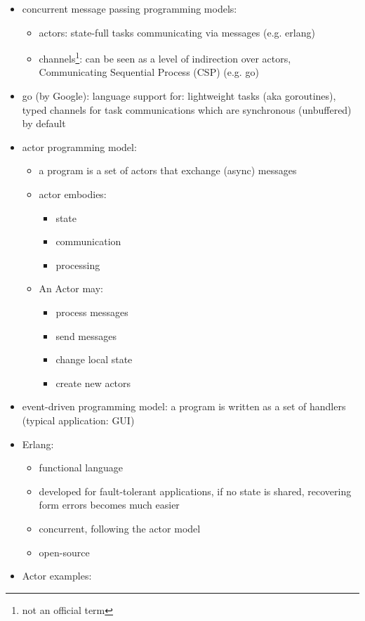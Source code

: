 \documentclass[a4paper]{article}
\begin{document}
\begin{itemize}
\begin{itemize}
\end{itemize}
\item concurrent message passing programming models: 
\begin{itemize}
\item actors: state-full tasks communicating via messages (e.g. erlang)
\item channels\footnote{not an official term}: can be seen as a level of indirection over actors, Communicating Sequential Process (CSP) (e.g. go)
\end{itemize}
\item go (by Google): language support for: lightweight tasks (aka goroutines), typed channels for task communications which are synchronous (unbuffered) by default 
\item actor programming model: 
\begin{itemize}
\item a program is a set of actors that exchange (async) messages
\item actor embodies:
\begin{itemize}
\item state
\item communication
\item processing
\end{itemize}
\item An Actor may:
\begin{itemize}
\item process messages
\item send messages
\item change local state
\item create new actors
\end{itemize}
\end{itemize}
\item event-driven programming model: a program is written as a set of handlers (typical application: GUI)
\item Erlang: 
\begin{itemize}
\item functional language
\item developed for fault-tolerant applications, if no state is shared, recovering form errors becomes much easier
\item concurrent, following the actor model
\item open-source 
\end{itemize}
\item Actor examples: 
\begin{itemize}

\end{itemize}
\end{itemize}
\end{document}
